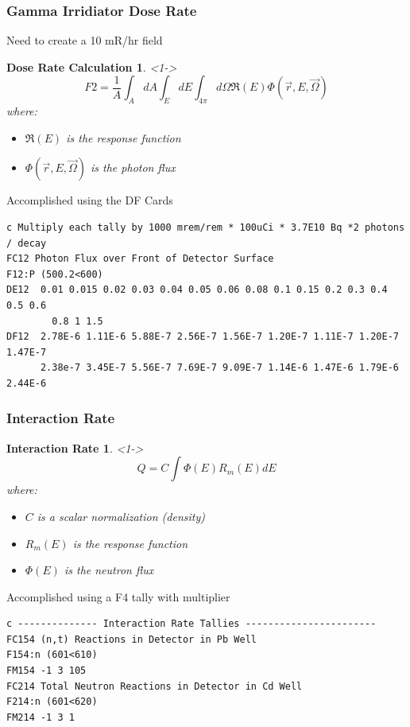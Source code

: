 \begin{frame}[fragile]
\frametitle{Gamma Irridiator Dose Rate}
	\tiny
	Need to create a 10 mR/hr field
	\newtheorem{thm10}{Dose Rate Calculation}
	\begin{thm10}<1->
		$$F2 = \frac{1}{A} \int_{A}{dA}\int_{E}{dE}\int_{4\pi}{d \Omega \Re(E) \Phi(\vec{r},E,\vec{\Omega})} $$
	where:
	\begin{itemize}
		\item $\Re(E)$ is the response function
		\item $\Phi(\vec{r},E,\vec{\Omega})$ is the photon flux
	\end{itemize}
	\end{thm10}
Accomplished using the DF Cards
\begin{lstlisting}
c Multiply each tally by 1000 mrem/rem * 100uCi * 3.7E10 Bq *2 photons / decay
FC12 Photon Flux over Front of Detector Surface
F12:P (500.2<600)
DE12  0.01 0.015 0.02 0.03 0.04 0.05 0.06 0.08 0.1 0.15 0.2 0.3 0.4 0.5 0.6  
		0.8 1 1.5
DF12  2.78E-6 1.11E-6 5.88E-7 2.56E-7 1.56E-7 1.20E-7 1.11E-7 1.20E-7 1.47E-7
      2.38e-7 3.45E-7 5.56E-7 7.69E-7 9.09E-7 1.14E-6 1.47E-6 1.79E-6 2.44E-6
\end{lstlisting}
\end{frame}

\begin{frame}[fragile]
\frametitle{Interaction Rate}
	\tiny
	\newtheorem{thm11}{Interaction Rate}
	\begin{thm11}<1->
		$$Q = C \int {\Phi(E) R_m(E) dE }$$
	where:
	\begin{itemize}
		\item $C$ is a scalar normalization (density)
		\item $R_m(E)$ is the response function
		\item $\Phi(E)$ is the neutron flux
	\end{itemize}
	\end{thm11}
Accomplished using a F4 tally with multiplier
\tiny
\begin{lstlisting}
c -------------- Interaction Rate Tallies -----------------------
FC154 (n,t) Reactions in Detector in Pb Well
F154:n (601<610)
FM154 -1 3 105
FC214 Total Neutron Reactions in Detector in Cd Well
F214:n (601<620)
FM214 -1 3 1
\end{lstlisting}
\end{frame}


